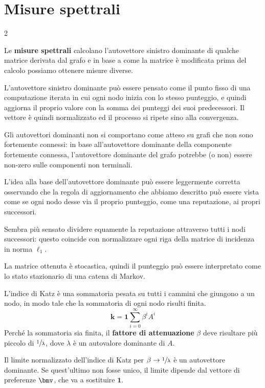 \documentclass[\main/main.tex]{subfiles}
\begin{document}
\section{Misure spettrali}
\begin{multicols}{2}
\begin{definition}
    Le \textbf{misure spettrali} calcolano l'autovettore sinistro dominante di qualche matrice derivata dal grafo e in base a come la matrice è modificata prima del calcolo possiamo ottenere misure diverse.
\end{definition}
\begin{definition}
    L'autovettore sinistro dominante può essere pensato come il punto fisso di una computazione iterata in cui ogni nodo inizia con lo stesso punteggio, e quindi aggiorna il proprio valore con la somma dei punteggi dei suoi predecessori. Il vettore è quindi normalizzato ed il processo si ripete sino alla convergenza.
    
    Gli autovettori dominanti non si comportano come atteso su grafi che non sono fortemente connessi: in base all'autovettore dominante della componente fortemente connessa, l'autovettore dominante del grafo potrebbe (o non) essere non-zero sulle componenti non terminali.
\end{definition}
\vfill\null
\columnbreak
\begin{definition}
    L'idea alla base dell'autovettore dominante può essere leggermente corretta osservando che la regola di aggiornamento che abbiamo descritto può essere vista come se ogni nodo desse via il proprio punteggio, come una reputazione, ai propri successori.
    
    Sembra più sensato dividere equamente la reputazione attraverso tutti i nodi successori: questo coincide con normalizzare ogni riga della matrice di incidenza in norma \(\ell_1\).
    
    La matrice ottenuta è stocastica, quindi il punteggio può essere interpretato come lo stato stazionario di una catena di Markov.
\end{definition}
\begin{observation}
    L'indice di Katz è una sommatoria pesata su tutti i cammini che giungono a un nodo, in modo tale che la sommatoria di ogni nodo risulti finita.
    \[
        \boldsymbol{k}=\mathbf{1} \sum_{i=0}^{\infty} \beta^{i} A^{i}
    \]
    Perché la sommatoria sia finita, il \textbf{fattore di attenuazione} \(\beta\) deve risultare più piccolo di \(\sfrac{1}{\lambda}\), dove \(\lambda\) è un autovalore dominante di \(A\).
    
    Il limite normalizzato dell'indice di Katz per \(\beta \rightarrow \sfrac{1}{\lambda}\) è un autovettore dominante. Se quest'ultimo non fosse unico, il limite dipende dal vettore di preferenze \(\bmv\), che va a sostituire \(\mathbf{1}\).
\end{observation}
\end{multicols}
\end{document}
